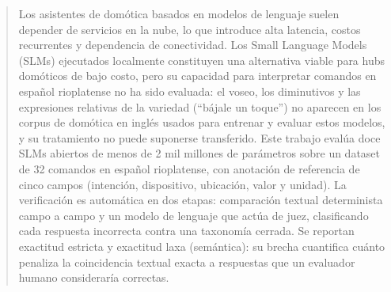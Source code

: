 \begin{abstract}
Los asistentes de domótica basados en modelos de lenguaje suelen depender de
servicios en la nube, lo que introduce alta latencia, costos recurrentes y
dependencia de conectividad. Los Small Language Models (SLMs) ejecutados
localmente constituyen una alternativa viable para hubs domóticos de bajo
costo, pero su capacidad para interpretar comandos en español rioplatense no
ha sido evaluada: el voseo, los diminutivos y las expresiones relativas de la
variedad (``bájale un toque'') no aparecen en los corpus de domótica en
inglés usados para entrenar y evaluar estos modelos, y su tratamiento no
puede suponerse transferido. Este trabajo evalúa doce SLMs abiertos de menos
de 2 mil millones de parámetros sobre un dataset de 32 comandos en español
rioplatense, con anotación de referencia de cinco campos (intención,
dispositivo, ubicación, valor y unidad). La verificación es automática en dos
etapas: comparación textual determinista campo a campo y un modelo de
lenguaje que actúa de juez, clasificando cada respuesta incorrecta contra una
taxonomía cerrada. Se reportan exactitud estricta y exactitud laxa
(semántica): su brecha cuantifica cuánto penaliza la coincidencia textual
exacta a respuestas que un evaluador humano consideraría correctas.

\end{abstract}
